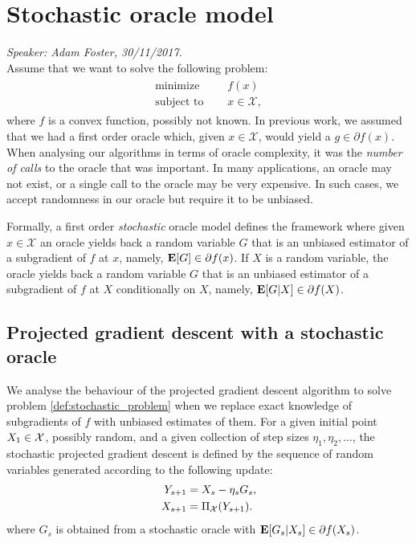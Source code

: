 
\chapter{Stochastic oracle model}
\emph{Speaker: Adam Foster, 30/11/2017.}\\

Assume that we want to solve the following problem:
\begin{align}
	\begin{aligned}
		\text{minimize }\quad   & f(x) \\
		\text{subject to }\quad & x\in \mathcal{X},
	\end{aligned}
	\label{def:stochastic_problem}
\end{align}
where $f$ is a convex function, possibly not known. In previous work, we assumed that we had a first order oracle which, given $x \in \mathcal{X}$, would yield a $g \in \partial f(x)$. When analysing our algorithms in terms of oracle complexity, it was the \textit{number of calls} to the oracle that was important. In many applications, an oracle may not exist, or a single call to the oracle may be very expensive. In such cases, we accept randomness in our oracle but require it to be unbiased.

Formally, a first order \emph{stochastic} oracle model defines the framework where given $x\in\mathcal{X}$ an oracle yields back a random variable $G$ that is an unbiased estimator of a subgradient of $f$ at $x$, namely, $\mathbf{E}[G] \in \partial f(x)$. If $X$ is a random variable, the oracle yields back a random variable $G$ that is an unbiased estimator of a subgradient of $f$ at $X$ conditionally on $X$, namely, $\mathbf{E}[G|X] \in \partial f(X)$.


\section{Projected gradient descent with a stochastic oracle}
We analyse the behaviour of the projected gradient descent algorithm to solve problem \eqref{def:stochastic_problem} when we replace exact knowledge of subgradients of $f$ with unbiased estimates of them. For a given initial point $X_1\in\mathcal{X}$, possibly random, and a given collection of step sizes $\eta_1,\eta_2,\ldots$, the stochastic projected gradient descent is defined by the sequence of random variables generated according to the following update:
\begin{align*}
Y_{s+1} &= X_s - \eta_s G_s,\\
X_{s+1} &= \Pi_{\mathcal{X}}(Y_{s+1}).
\end{align*}
where $G_s$ is obtained from a stochastic oracle with $\mathbf{E}[G_s|X_s] \in \partial f(X_s)$.

